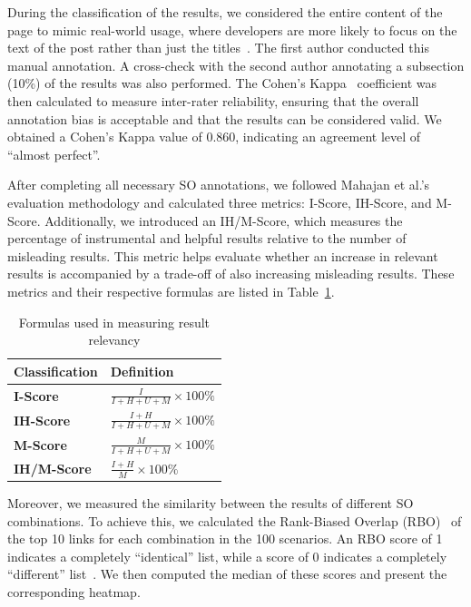 \documentclass[preprint,12pt]{elsarticle}
\begin{document}
During the classification of the results, we considered the entire content of the page to mimic real-world usage, where developers are more likely to focus on the text of the post rather than just the titles~\cite{o0,r6}. The first author conducted this manual annotation. A cross-check with the second author annotating a subsection (10\%) of the results was also performed. The Cohen's Kappa~\cite{kappa} coefficient was then calculated to measure inter-rater reliability, ensuring that the overall annotation bias is acceptable and that the results can be considered valid. We obtained a Cohen's Kappa value of 0.860, indicating an agreement level of ``almost perfect''.

After completing all necessary SO annotations, we followed Mahajan et al.'s evaluation methodology and calculated three metrics: I-Score, IH-Score, and M-Score. Additionally, we introduced an IH/M-Score, which measures the percentage of instrumental and helpful results relative to the number of misleading results. This metric helps evaluate whether an increase in relevant results is accompanied by a trade-off of also increasing misleading results. These metrics and their respective formulas are listed in Table~\ref{table: metric}.

\renewcommand{\arraystretch}{1.8}
\begin{table}[ht]
    \centering
    \caption{Formulas used in measuring result relevancy}
    \label{table: metric}
    \footnotesize
\begin{tabular}{m{3.6cm}m{9.2cm} }
\bottomrule
    \hline
\rowcolor{gray!20} 
\textbf{Classification} & \textbf{Definition}  \\
\hline
 \textbf{I-Score} & $\tfrac{I}{I+H+U+M} \times 100\%  $ \\
 \hline
 \textbf{IH-Score} & $\tfrac{I+H}{I+H+U+M} \times 100\%  $ \\
 \hline
\textbf{M-Score} & $ \tfrac{M}{I+H+U+M} \times 100\% $\\
 \hline
 \textbf{IH/M-Score} & $ \tfrac{I+H}{M} \times 100\% $\\
 \bottomrule
  \hline
\end{tabular}
    
\end{table}

Moreover, we measured the similarity between the results of different SO combinations. To achieve this, we calculated the Rank-Biased Overlap (RBO)~\cite{rbo} of the top 10 links for each combination in the 100 scenarios. An RBO score of 1 indicates a completely ``identical'' list, while a score of 0 indicates a completely ``different'' list~\cite{rbo}. We then computed the median of these scores and present the corresponding heatmap.
\end{document}
